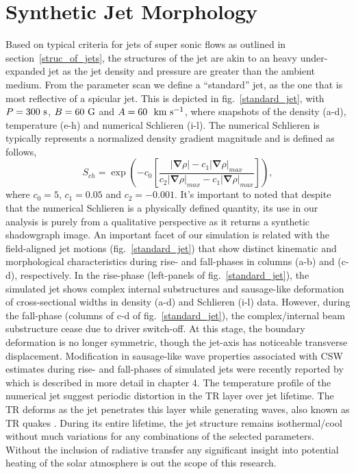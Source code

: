 \documentclass[12pt]{ociamthesis}
\newcommand{\kms}{~\rm{km ~s^{-1}}}
\newcommand{\np}{\\ \\}
\begin{document}
\section{Synthetic Jet Morphology}
Based on typical criteria for jets of super sonic flows as outlined in section~\ref{struc_of_jets}, the structures of the jet are akin to an heavy under-expanded jet \citep{Norman1982, Edgington-Mitchell2014} as the jet density and pressure are greater than the ambient medium. From the parameter scan we define a ``standard'' jet, as the one that is most reflective of a spicular jet. This is depicted in fig.~\ref{standard_jet}, with $P=300~\rm{s}$, $B=60~\rm{G}$ and $A=60~\kms$, where snapshots of the density (a-d), temperature (e-h) and numerical Schlieren (i-l). The numerical Schlieren is typically represents a normalized density gradient magnitude and is defined as follows,
\begin{equation}
    S_{ch} = \exp{\left( -c_0 \left[ \frac{|\boldsymbol{\nabla} \rho|-c_1 |\boldsymbol{\nabla} \rho|_{max}}{c_2 |\boldsymbol{\nabla} \rho|_{max}-c_1|\boldsymbol{\nabla} \rho|_{max}} \right] \right)}, 
\end{equation}
where $c_0=5$, $c_1=0.05$ and $c_2=-0.001$. It's important to noted that despite that the numerical Schlieren is a physically defined quantity, its use in our analysis is purely from a qualitative perspective as it returns a synthetic shadowgraph image. An important facet of our simulation is related with the field-aligned jet motions (fig.~\ref{standard_jet}) that show distinct kinematic and morphological characteristics during rise- and fall-phases in columns (a-b) and (c-d), respectively. In the rise-phase (left-panels of fig.~\ref{standard_jet}), the simulated jet shows complex internal substructures and sausage-like deformation of cross-sectional widths in density (a-d) and Schlieren (i-l) data. However, during the fall-phase (columns of c-d of fig.~\ref{standard_jet}), the complex/internal beam substructure cease due to driver switch-off. At this stage, the boundary deformation is no longer symmetric, though the jet-axis has noticeable transverse displacement. Modification in sausage-like wave properties associated with CSW estimates during rise- and fall-phases of simulated jets were recently reported by \citep{Dover2020ApJ90572D} which is described in more detail in chapter 4. The temperature profile of the numerical jet suggest periodic distortion in the TR layer over jet lifetime. The TR deforms as the jet penetrates this layer while generating waves, also known as TR quakes \citep{Scullion2011ApJ74314S}. During its entire lifetime, the jet structure remains isothermal/cool without much variations for any combinations of the selected parameters. Without the inclusion of radiative transfer any significant insight into potential heating of the solar atmosphere is out the scope of this research. \np
\end{document}
